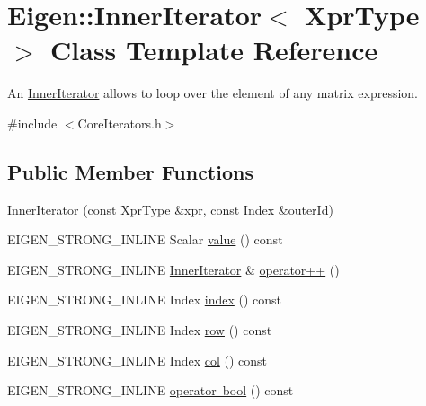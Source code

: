 \hypertarget{class_eigen_1_1_inner_iterator}{}\section{Eigen\+::Inner\+Iterator$<$ Xpr\+Type $>$ Class Template Reference}
\label{class_eigen_1_1_inner_iterator}


An \mbox{\hyperlink{class_eigen_1_1_inner_iterator}{Inner\+Iterator}} allows to loop over the element of any matrix expression.  




{\ttfamily \#include $<$Core\+Iterators.\+h$>$}

\subsection*{Public Member Functions}
\begin{DoxyCompactItemize}
\item 
\mbox{\hyperlink{class_eigen_1_1_inner_iterator_abbcdcf4d5ecb4445654b7940204cb750}{Inner\+Iterator}} (const Xpr\+Type \&xpr, const Index \&outer\+Id)
\item 
E\+I\+G\+E\+N\+\_\+\+S\+T\+R\+O\+N\+G\+\_\+\+I\+N\+L\+I\+NE Scalar \mbox{\hyperlink{class_eigen_1_1_inner_iterator_ab04bccb41eb22ffcb92dc61125aab119}{value}} () const
\item 
E\+I\+G\+E\+N\+\_\+\+S\+T\+R\+O\+N\+G\+\_\+\+I\+N\+L\+I\+NE \mbox{\hyperlink{class_eigen_1_1_inner_iterator}{Inner\+Iterator}} \& \mbox{\hyperlink{class_eigen_1_1_inner_iterator_ae4ed2eece5291e23d870b7238878e2f1}{operator++}} ()
\item 
E\+I\+G\+E\+N\+\_\+\+S\+T\+R\+O\+N\+G\+\_\+\+I\+N\+L\+I\+NE Index \mbox{\hyperlink{class_eigen_1_1_inner_iterator_ac9e0e40b8aceb192a0e1c7d656148760}{index}} () const
\item 
E\+I\+G\+E\+N\+\_\+\+S\+T\+R\+O\+N\+G\+\_\+\+I\+N\+L\+I\+NE Index \mbox{\hyperlink{class_eigen_1_1_inner_iterator_a3ab6f3afdf62740623cdc9ecb14dc132}{row}} () const
\item 
E\+I\+G\+E\+N\+\_\+\+S\+T\+R\+O\+N\+G\+\_\+\+I\+N\+L\+I\+NE Index \mbox{\hyperlink{class_eigen_1_1_inner_iterator_a1d2ccb720e90bc6928064cc30c41fb93}{col}} () const
\item 
E\+I\+G\+E\+N\+\_\+\+S\+T\+R\+O\+N\+G\+\_\+\+I\+N\+L\+I\+NE \mbox{\hyperlink{class_eigen_1_1_inner_iterator_a0f11df2dfcd1c48c54aa29e605c09310}{operator bool}} () const
\end{DoxyCompactItemize}
